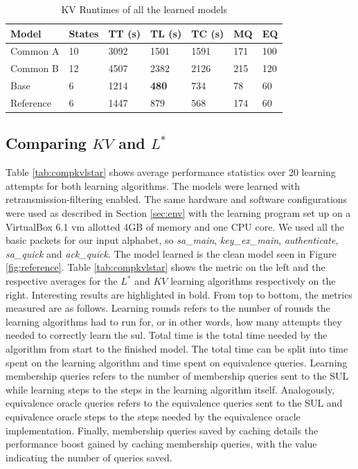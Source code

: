 \begin{table}[h]
	\centering
	\begin{tabular}{|l|l|l|l|l|l|l|}
		\hline
		\rowcolor[HTML]{C0C0C0} 
		Model     & States & TT (s)  & TL (s)  & TC (s)  & MQ  & EQ  \\ \hline
		Common A  & 10     & 3092 & 1501 & 1591 & 171 & 100 \\ \hline
		Common B  & 12     & 4507 & 2382 & 2126 & 215 & 120 \\ \hline
		Base      & 6      & 1214 & \textbf{480}  & 734  & 78  & 60  \\ \hline
		Reference & 6      & 1447 & 879  & 568  & 174 & 60  \\ \hline
	\end{tabular}
	\caption{KV Runtimes of all the learned models}
	\label{tab:runtime_summary_kv}
\end{table}
\newpage



\subsection{Comparing $KV$ and $L^*$} \label{subsec:comp_kv_lstar}
Table \ref{tab:compkvlstar} shows average performance statistics over 20 learning attempts for both learning algorithms. The models were learned with retransmission-filtering enabled. The same hardware and software configurations were used as described in Section \ref{sec:env} with the learning program set up on a VirtualBox 6.1 \ac{vm} allotted 4GB of memory and one CPU core. We used all the basic packets for our input alphabet, so
\emph{sa\_main}, \emph{key\_ex\_main}, \emph{authenticate}, \emph{sa\_quick} and \emph{ack\_quick}. The model learned is the clean model seen in Figure \ref{fig:reference}. Table \ref{tab:compkvlstar} shows the metric on the left and the respective averages for the $L^*$ and $KV$ learning algorithms respectively on the right. Interesting results are highlighted in bold. From top to bottom, the metrics measured are as follows. Learning rounds refers to the number of rounds the learning algorithms had to run for, or in other words, how many attempts they needed to correctly learn the \ac{sul}. Total time is the total time needed by the algorithm from start to the finished model. The total time can be split into time spent on the learning algorithm and time spent on equivalence queries. Learning membership queries refers to the number of membership queries sent to the SUL while learning steps to the steps in the learning algorithm itself. Analogously, equivalence oracle queries refers to the equivalence queries sent to the SUL and equivalence oracle steps to the steps needed by the equivalence oracle implementation. Finally, membership queries saved by caching details the performance boost gained by caching membership queries, with the value indicating the number of queries saved.


